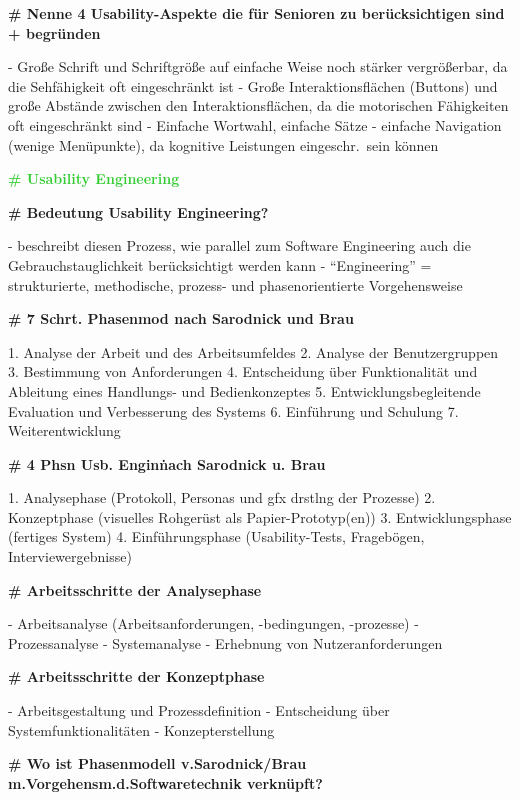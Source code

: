 \documentclass{article}
\begin{document}
\begin{multicols}{3}
\begin{flushleft}
\begin{tiny}
			\textbf{\# Nenne 4 Usability-Aspekte die für Senioren zu
				berücksichtigen sind + begründen}

			- Große Schrift und Schriftgröße auf einfache Weise noch stärker
			  vergrößerbar, da die Sehfähigkeit oft eingeschränkt ist
			- Große Interaktionsflächen (Buttons) und große Abstände zwischen
			  den Interaktionsflächen, da die motorischen Fähigkeiten oft
			  eingeschränkt sind
			- Einfache Wortwahl, einfache Sätze
			- einfache Navigation (wenige Menüpunkte), da kognitive Leistungen
			  eingeschr.\ sein können

			\textcolor{LimeGreen}{\textbf{\scriptsize{\# Usability
				Engineering}}}

			\textbf{\# Bedeutung Usability Engineering?}

			- beschreibt diesen Prozess, wie parallel zum Software Engineering
			  auch die Gebrauchstauglichkeit berücksichtigt werden kann
			- ``Engineering'' = strukturierte, methodische, prozess- und
			  phasenorientierte Vorgehensweise

			\textbf{\# 7 Schrt. Phasenmod nach Sarodnick und Brau}

			1. Analyse der Arbeit und des Arbeitsumfeldes
			2. Analyse der Benutzergruppen
	 		3. Bestimmung von Anforderungen
			4. Entscheidung über Funktionalität und Ableitung eines Handlungs-
			   und Bedienkonzeptes
			5. Entwicklungsbegleitende Evaluation und Verbesserung des Systems
			6. Einführung und Schulung
			7. Weiterentwicklung

			\textbf{\# 4 Phsn Usb. Engin\. nach Sarodnick u. Brau}

			1. Analysephase (Protokoll, Personas und gfx drstlng der Prozesse)
			2. Konzeptphase (visuelles Rohgerüst als Papier-Prototyp(en))
			3. Entwicklungsphase (fertiges System)
			4. Einführungsphase (Usability-Tests, Fragebögen,
			   Interviewergebnisse)

			\textbf{\# Arbeitsschritte der Analysephase}

			- Arbeitsanalyse (Arbeitsanforderungen, -bedingungen, -prozesse)
			- Prozessanalyse
			- Systemanalyse
			- Erhebnung von Nutzeranforderungen

			\textbf{\# Arbeitsschritte der Konzeptphase}

			- Arbeitsgestaltung und Prozessdefinition
			- Entscheidung über Systemfunktionalitäten
			- Konzepterstellung

			\textbf{\# Wo ist Phasenmodell v.Sarodnick/Brau
				m.Vorgehensm.d.Softwaretechnik verknüpft?}


\end{tiny}
\end{flushleft}
\end{multicols}
\end{document}
